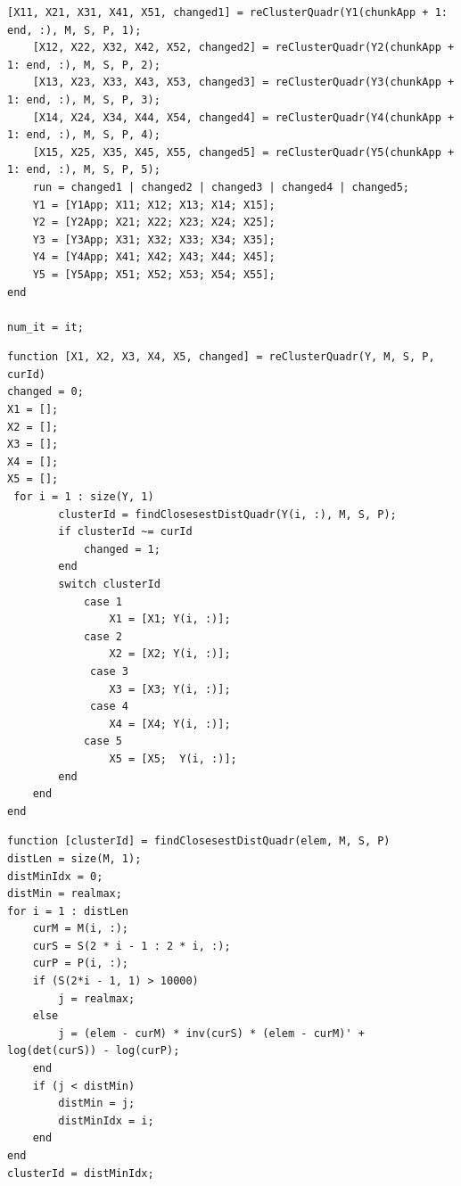 \begin{lstlisting}[caption={Метод квадратне декомпозиције},label={fun:quadr}]
    [X11, X21, X31, X41, X51, changed1] = reClusterQuadr(Y1(chunkApp + 1: end, :), M, S, P, 1);
    [X12, X22, X32, X42, X52, changed2] = reClusterQuadr(Y2(chunkApp + 1: end, :), M, S, P, 2);
    [X13, X23, X33, X43, X53, changed3] = reClusterQuadr(Y3(chunkApp + 1: end, :), M, S, P, 3);
    [X14, X24, X34, X44, X54, changed4] = reClusterQuadr(Y4(chunkApp + 1: end, :), M, S, P, 4);
    [X15, X25, X35, X45, X55, changed5] = reClusterQuadr(Y5(chunkApp + 1: end, :), M, S, P, 5);
    run = changed1 | changed2 | changed3 | changed4 | changed5;
    Y1 = [Y1App; X11; X12; X13; X14; X15];
    Y2 = [Y2App; X21; X22; X23; X24; X25];
    Y3 = [Y3App; X31; X32; X33; X34; X35];
    Y4 = [Y4App; X41; X42; X43; X44; X45];
    Y5 = [Y5App; X51; X52; X53; X54; X55];
end

num_it = it;
\end{lstlisting}

\begin{lstlisting}[caption={Функција проналажења одговарајућег кластера},label={fun:reclusterQuadr}]
function [X1, X2, X3, X4, X5, changed] = reClusterQuadr(Y, M, S, P, curId)
changed = 0;
X1 = [];
X2 = [];
X3 = [];
X4 = [];
X5 = [];
 for i = 1 : size(Y, 1)
        clusterId = findClosesestDistQuadr(Y(i, :), M, S, P);
        if clusterId ~= curId
            changed = 1;
        end
        switch clusterId
            case 1
                X1 = [X1; Y(i, :)];
            case 2
                X2 = [X2; Y(i, :)];
             case 3
                X3 = [X3; Y(i, :)];
             case 4
                X4 = [X4; Y(i, :)];
            case 5
                X5 = [X5;  Y(i, :)];
        end
    end
end
\end{lstlisting}

\begin{lstlisting}[caption={Функција проналажења одговарајућег кластера},label={fun:reclusterQuadSearch}]
function [clusterId] = findClosesestDistQuadr(elem, M, S, P)
distLen = size(M, 1);
distMinIdx = 0;
distMin = realmax;
for i = 1 : distLen
    curM = M(i, :);
    curS = S(2 * i - 1 : 2 * i, :);
    curP = P(i, :);
    if (S(2*i - 1, 1) > 10000)
        j = realmax;
    else
        j = (elem - curM) * inv(curS) * (elem - curM)' + log(det(curS)) - log(curP);
    end
    if (j < distMin)
        distMin = j;
        distMinIdx = i;
    end
end
clusterId = distMinIdx;
\end{lstlisting}


